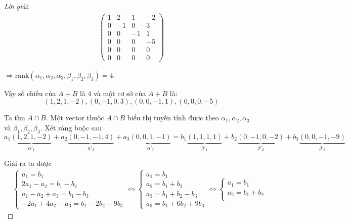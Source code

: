 \documentclass[class=linearalgebra,crop=false]{standalone}
\begin{document}
\begin{proof}[Lời giải]
\begin{align*}
\begin{pmatrix}
            1 & 2  & 1  & -2 \\
            0 & -1 & 0  & 3  \\
            0 & 0  & -1 & 1  \\
            0 & 0  & 0  & -5 \\
            0 & 0  & 0  & 0  \\
            0 & 0  & 0  & 0
        \end{pmatrix}
    \end{align*}
    \par $\Rightarrow\text{rank}(\alpha_{1},\alpha_{2},\alpha_{3},\beta_{1},\beta_{2},\beta_{3}) = 4$.
    \par Vậy số chiều của $A + B$ là $4$ và một cơ sở của $A + B$ là:
    \[ (1, 2, 1, -2), (0, -1, 0, 3), (0, 0, -1, 1), (0, 0, 0, -5) \]
    \par Ta tìm $A\cap B$. Một vector thuộc $A\cap B$ biểu thị tuyến tính được theo $\alpha_{1}, \alpha_{2}, \alpha_{3}$ và $\beta_{1}, \beta_{2}, \beta_{3}$. Xét ràng buộc sau
    \[ a_{1}\underbrace{(1,2,1,-2)}_{\alpha'_{1}} + a_{2}\underbrace{(0,-1,-1,4)}_{\alpha'_{2}} + a_{3}\underbrace{(0,0,1,-1)}_{\alpha'_{3}} = b_{1}\underbrace{(1,1,1,1)}_{\beta'_{1}} + b_{2}\underbrace{(0,-1,0,-2)}_{\beta'_{2}} + b_{3}\underbrace{(0,0,-1,-9)}_{\beta'_{3}} \]
    \par Giải ra ta được
    \begin{align*}
         & \begin{cases}
               a_{1} = b_{1}                         \\
               2a_{1} - a_{2} = b_{1} - b_{2}        \\
               a_{1} - a_{2} + a_{3} = b_{1} - b_{3} \\
               -2a_{1} + 4a_{2} - a_{3} = b_{1} - 2b_{2} - 9b_{3}
           \end{cases}
        \Longleftrightarrow
        \begin{cases}
            a_{1} = b_{1}                 \\
            a_{2} = b_{1} + b_{2}         \\
            a_{3} = b_{1} + b_{2} - b_{3} \\
            a_{3} = b_{1} + 6b_{2} + 9b_{3}
        \end{cases}
        \Longleftrightarrow
        \begin{cases}
            a_{1} = b_{1}                 \\
            a_{2} = b_{1} + b_{2}         \\

\end{cases}
\end{align*}
\end{proof}
\end{document}
